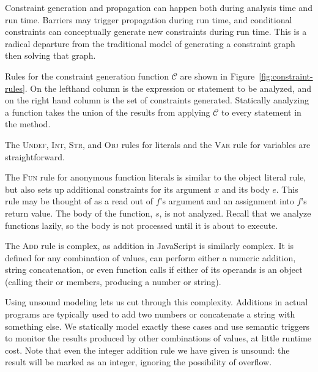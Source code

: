 Constraint generation and propagation can happen both during analysis time and
run time. Barriers may trigger propagation during run time, and conditional
constraints can conceptually generate new constraints during run time. This is
a radical departure from the traditional model of generating a constraint
graph then solving that graph.

Rules for the constraint generation function $\mathcal{C}$ are shown in
Figure~\ref{fig:constraint-rules}. On the lefthand column is the expression or
statement to be analyzed, and on the right hand column is the set of constraints
generated. Statically analyzing a function takes the union of
the results from applying $\mathcal{C}$ to every statement in the method.

The \textsc{Undef}, \textsc{Int}, \textsc{Str}, and \textsc{Obj}
rules for literals and the \textsc{Var} rule for variables are
straightforward.

The \textsc{Fun} rule for anonymous function literals is similar to the object
literal rule, but also sets up additional constraints for its argument $x$ and
its body $e$. This rule may be thought of as a read out of $f$'s argument and an
assignment into $f$'s return value. The body of the function, $s$, is not analyzed. Recall that we analyze functions lazily, so the body is not processed until it is about to execute.

The \textsc{Add} rule is complex, as addition in JavaScript is similarly complex. It is
defined for any combination of values, can perform either a numeric addition,
string concatenation, or even function calls if either of its operands is an
object (calling their  or  members, producing a
number or string).

Using unsound modeling lets us cut through this complexity.
Additions in actual programs are typically used to add two numbers
or concatenate a string with something else.
We statically model exactly these cases
and use semantic triggers to monitor the results produced by other
combinations of values, at little runtime cost.
Note that even the integer addition rule we have given is unsound: the
result will be marked as an integer, ignoring the possibility of
overflow.

